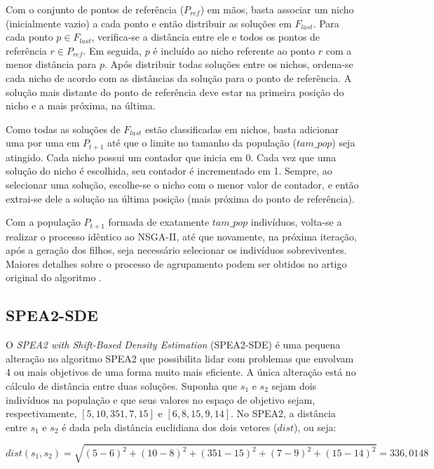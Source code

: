 Com o conjunto de pontos de referência ($P_{ref}$) em mãos, basta associar um nicho (inicialmente vazio) a cada ponto e então distribuir as soluções em $F_{last}$. Para cada ponto $p \in F_{last}$, verifica-se a distância entre ele e todos os pontos de referência $r \in P_{ref}$. Em seguida, $p$ é incluído ao nicho referente ao ponto $r$ com a menor distância para $p$. Após distribuir todas soluções entre os nichos, ordena-se cada nicho de acordo com as distâncias da solução para o ponto de referência. A solução mais distante do ponto de referência deve estar na primeira posição do nicho e a mais próxima, na última.

Como todas as soluções de $F_{last}$ estão classificadas em nichos, basta adicionar uma por uma em $P_{t+1}$ até que o limite no tamanho da população ($tam\_pop$) seja atingido. Cada nicho possui um contador que inicia em 0. Cada vez que uma solução do nicho é escolhida, seu contador é incrementado em 1. Sempre, ao selecionar uma solução, escolhe-se o nicho com o menor valor de contador, e então extrai-se dele a solução na última posição (mais próxima do ponto de referência).

Com a população $P_{t+1}$ formada de exatamente $tam\_pop$ indivíduos, volta-se a realizar o processo idêntico ao NSGA-II, até que novamente, na próxima iteração, após a geração dos filhos, seja necessário selecionar os indivíduos sobreviventes. Maiores detalhes sobre o processo de agrupamento podem ser obtidos no artigo original do algoritmo \cite{Deb2014}.

\subsection{SPEA2-SDE}

O \textit{SPEA2 with Shift-Based Density Estimation} (SPEA2-SDE) \cite{Spea2SDE} é uma pequena alteração no algoritmo SPEA2 que possibilita lidar com problemas que envolvam 4 ou mais objetivos de uma forma muito mais eficiente. A única alteração está no cálculo de distância entre duas soluções. Suponha que $s_1$ e $s_2$ sejam dois indivíduos na população e que seus valores no espaço de objetivo sejam, respectivamente, $[5, 10, 351, 7, 15]$ e $[6, 8, 15, 9, 14]$. No SPEA2, a distância entre $s_1$ e $s_2$ é dada pela distância euclidiana dos dois vetores ($dist$), ou seja:

\begin{equation}dist(s_1, s_2) = \sqrt{(5-6)^2 + (10-8)^2 + (351-15)^2 + (7-9)^2 + (15-14)^2} = 336,0148\end{equation}

